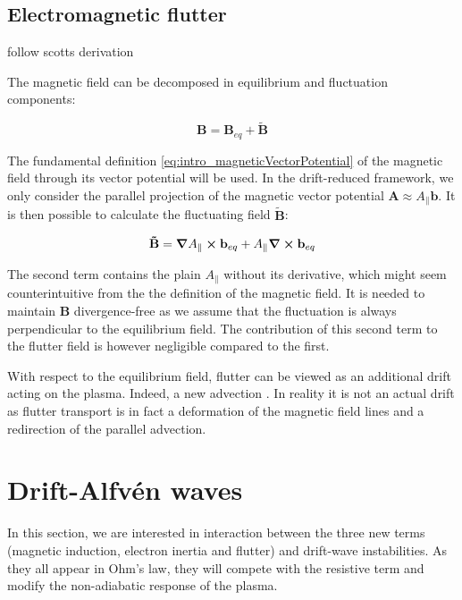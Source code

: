 \subsection{Electromagnetic flutter}

follow scotts derivation

The magnetic field can be decomposed in equilibrium and fluctuation components:

\begin{equation}
	\mathbf{B} = \mathbf{B}_{eq} + \mathbf{\tilde{B}}
\end{equation}

The fundamental definition \ref{eq:intro_magneticVectorPotential} of the magnetic field through its vector potential will be used. In the drift-reduced framework, we only consider the parallel projection of the magnetic vector potential $\mathbf{A} \approx A_\parallel\mathbf{b}$. It is then possible to calculate the fluctuating field $\mathbf{\tilde{B}}$:

\begin{equation}
	\mathbf{\tilde{B}} = \grad A_\parallel\cross\mathbf{b}_{eq} + A_\parallel \grad\cross \mathbf{b}_{eq}
\end{equation}

The second term contains the plain $A_\parallel$ without its derivative, which might seem counterintuitive from the the definition of the magnetic field. It is needed to maintain $\mathbf{B}$ divergence-free as we assume that the fluctuation is always perpendicular to the equilibrium field. The contribution of this second term to the flutter field is however negligible compared to the first.

With respect to the equilibrium field, flutter can be viewed as an additional drift acting on the plasma. Indeed, a new advection . In reality it is not an actual drift as flutter transport is in fact a deformation of the magnetic field lines and a redirection of the parallel advection. 


\section{Drift-Alfvén waves}

In this section, we are interested in interaction between the three new terms (magnetic induction, electron inertia and flutter) and drift-wave instabilities. As they all appear in Ohm's law, they will compete with the resistive term and modify the non-adiabatic response of the plasma. 

